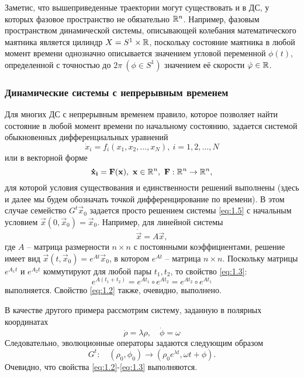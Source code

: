 Заметис, что вышеприведенные траектории могут существовать и в ДС, у которых фазовое пространство не обязательно $\mathbb{R}^n$. Например, фазовым пространством динамической системы, описывающей колебания математического маятника является цилиндр $X= S^1 \times \mathbb{R} $, поскольку состояние маятника в любой момент времени однозначно описывается значением угловой переменной $\phi(t)$, определенной с точностью до $2\pi ~ (\phi \in S^1)$  значением её скорости $\dot {\varphi} \in \mathbb{R}$.

\subsubsection{Динамические системы с непрерывным временем} %
Для многих ДС с непрерывным временем правило, которое позволяет найти состояние в любой момент времени по начальному состоянию, задается системой обыкновенных дифференциальных уравнений
\begin{equation}
	\dot x_i = f_i (x_1,x_2,\dots, x_N), ~ i = 1,2, \dots, N
\end{equation}
или в векторной форме
\begin{equation}
	\label{eq:1.5}
	\mathbf {\dot x_i} = \mathbf F (\mathbf x), ~ \mathbf x \in \mathbb{R}^n, ~ \mathbf F: \mathbb{R}^n \rightarrow \mathbb{R}^n,
\end{equation}
для которой условия существования и единственности решений выполнены (здесь и далее мы будем обозначать точкой дифференцирование по времени). В этом случае семейство $G^t \vec x_0$ задается просто решением системы \eqref{eq:1.5} с начальным условием $\vec x(0, \vec x_0)= \vec x_0$. Например, для линейной системы
\begin{equation}
	\dot {\vec x} = A \vec x,
\end{equation} 
где $A$ -- матрица размерности $n \times n $ с постоянными коэффициентами, решение имеет вид $\vec x(t, \vec x_0)= e^{At} \vec x_0$, в котором $e^{At}$ -- матрица $n \times n$. Поскольку матрицы $e^{A_1t}$ и $e^{A_2t}$ коммутируют для любой пары $t_1, t_2$, то свойство \eqref{eq:1.3}:
\begin{equation}
	e^{A(t_1+t_2)}= e^{At_1}\circ e^{At_2} = e^{At_2}\circ e^{At_1} 
\end{equation}
выполняется. Свойство \eqref{eq:1.2} также, очевидно, выполнено.

В качестве другого примера рассмотрим систему, заданную в полярных координатах
\begin{equation}
	\dot \rho = \lambda \rho, \quad \dot \phi = \omega
\end{equation}
Следовательно, эволюционные операторы задаются следующим образом
\begin{equation}
	G^t:\quad (\rho_0,\phi_0) \rightarrow (\rho_0 e^{\lambda t}, \omega t + \phi).
\end{equation}
Очевидно, что свойства \eqref{eq:1.2}-\eqref{eq:1.3} выполняются.

